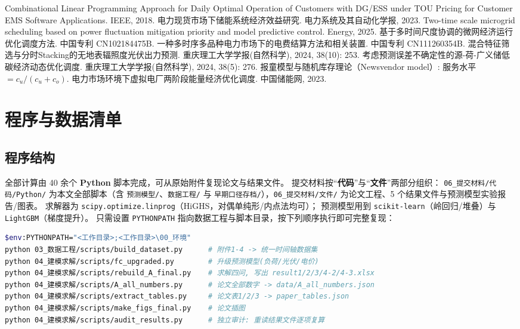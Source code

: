 \documentclass[withoutpreface,bwprint]{cumcmthesis}
\begin{document}
\begin{enumerate}[label=(\arabic*), leftmargin=2.4em, itemsep=1pt]
\begin{thebibliography}{9}
 Combinational Linear Programming Approach for Daily Optimal Operation of Customers with
DG/ESS under TOU Pricing for Customer EMS Software Applications. IEEE, 2018.
 电力现货市场下储能系统经济效益研究. 电力系统及其自动化学报, 2023.
 Two-time scale microgrid scheduling based on power fluctuation mitigation priority and
model predictive control. Energy, 2025.
 基于多时间尺度协调的微网经济运行优化调度方法. 中国专利 CN102184475B.
 一种多时序多品种电力市场下的电费结算方法和相关装置. 中国专利 CN111260354B.
 混合特征筛选与分时Stacking的无地表辐照度光伏出力预测. 重庆理工大学学报(自然科学), 2024, 38(10): 253.
 考虑预测误差不确定性的源-荷-广义储低碳经济动态优化调度. 重庆理工大学学报(自然科学), 2024, 38(5): 276.
 报童模型与随机库存理论（Newsvendor model）: 服务水平 $=c_u/(c_u+c_o)$.
 电力市场环境下虚拟电厂两阶段能量经济优化调度. 中国储能网, 2023.
\end{thebibliography}


\appendix

\section{程序与数据清单}

\subsection{程序结构}

全部计算由 40 余个 \textbf{Python} 脚本完成，可从原始附件复现论文与结果文件。
提交材料按“\textbf{代码}”与“\textbf{文件}”两部分组织：
\texttt{06\_提交材料/代码/Python/} 为本文全部脚本（含 \texttt{预测模型/}、\texttt{数据工程/}
与 \texttt{早期口径存档/}），\texttt{06\_提交材料/文件/} 为论文工程、5 个结果文件与预测模型实验报告/图表。
求解器为 \texttt{scipy.optimize.linprog}（HiGHS，对偶单纯形/内点法均可）；
预测模型用到 \texttt{scikit-learn}（岭回归/堆叠）与 \texttt{LightGBM}（梯度提升）。
只需设置 \texttt{PYTHONPATH} 指向数据工程与脚本目录，按下列顺序执行即可完整复现：

\begin{lstlisting}[language=bash, caption={一键复现流程（Windows PowerShell）}]
$env:PYTHONPATH="<工作目录>;<工作目录>\00_环境"
python 03_数据工程/scripts/build_dataset.py      # 附件1-4 -> 统一时间轴数据集
python 04_建模求解/scripts/fc_upgraded.py        # 升级预测模型(负荷/光伏/电价)
python 04_建模求解/scripts/rebuild_A_final.py    # 求解四问, 写出 result1/2/3/4-2/4-3.xlsx
python 04_建模求解/scripts/A_all_numbers.py      # 论文全部数字 -> data/A_all_numbers.json
python 04_建模求解/scripts/extract_tables.py     # 论文表1/2/3 -> paper_tables.json
python 04_建模求解/scripts/make_figs_final.py    # 论文插图
python 04_建模求解/scripts/audit_results.py      # 独立审计: 重读结果文件逐项复算
\end{lstlisting}


\end{enumerate}
\end{document}
